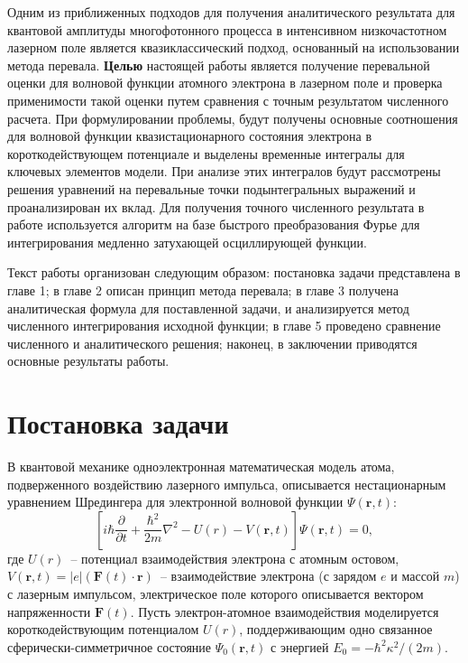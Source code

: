 \documentclass[14pt]{article}
\numberwithin{figure}{section}
\numberwithin{equation}{section}
\newcommand{\sectionbreak}{\clearpage}
\newcommand{\vF}{\mathbf{F}}
\newcommand{\vr}{\mathbf{r}}
\begin{document}
Одним из приближенных подходов для получения аналитического результата для квантовой амплитуды многофотонного процесса в интенсивном низкочастотном лазерном поле является квазиклассический подход, основанный на использовании метода перевала. \textbf{Целью} настоящей работы является получение перевальной оценки для волновой функции атомного электрона в лазерном поле и проверка применимости такой оценки путем сравнения с точным результатом численного расчета. При формулировании проблемы, будут получены основные соотношения для волновой функции квазистационарного состояния электрона в короткодействующем потенциале и выделены временные интегралы для ключевых элементов модели. При анализе этих интегралов будут рассмотрены решения уравнений на перевальные точки подынтегральных выражений и проанализирован их вклад. Для получения точного численного результата в работе используется алгоритм на базе быстрого преобразования Фурье для интегрирования медленно затухающей осциллирующей функции.

Текст работы организован следующим образом: постановка задачи представлена в главе 1; в главе 2 описан принцип метода перевала; в главе 3 получена аналитическая формула для поставленной задачи, и анализируется метод численного интегрирования исходной функции; в главе 5 проведено сравнение численного и аналитического решения; наконец, в заключении приводятся основные результаты работы. 
\sectionbreak


\section{Постановка задачи}

В квантовой механике одноэлектронная математическая модель атома, подверженного воздействию
лазерного импульса, описывается нестационарным уравнением Шредингера для электронной волновой функции $\Psi(\vr,t)$:
\begin{equation}
\label{TDSE}
\left[i\hbar\frac{\partial}{\partial t} + \frac{\hbar^2}{2m}\nabla^2 - U(r) - V(\vr,t)\right]\Psi(\vr,t) = 0,
\end{equation}
где $U(r)$~-- потенциал взаимодействия электрона с атомным остовом, $V(\vr,t)=|e|(\vF(t)\cdot\vr)$~-- взаимодействие электрона (с зарядом $e$ и массой $m$) с лазерным импульсом, электрическое поле которого описывается вектором напряженности $\vF(t)$.\cite{7} Пусть электрон-атомное взаимодействия моделируется короткодействующим потенциалом $U(r)$, поддерживающим одно связанное сферически-симметричное состояние $\Psi_0(\vr,t)$ с энергией $E_0=-\hbar^2\kappa^2/(2m)$.
\end{document}
